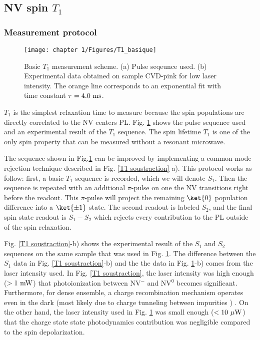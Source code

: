 \documentclass[a4paper,11pt]{report}
\begin{document}
\begin{refsection}
\subsection{NV spin $T_1$}
\label{sec T1 NV}
\subsubsection{Measurement protocol}
\begin{figure}[h!]
\centering
\texttt{[image: chapter 1/Figures/T1\_basique]}
\caption{Basic $T_1$ measurement scheme. (a) Pulse seqeunce used. (b) Experimental data obtained on sample CVD-pink for low laser intensity. The orange line corresponds to an exponential fit with time constant $\tau=4.0\ \rm ms$.}
\label{T1 basique}
\end{figure}


$T_1$ is the simplest relaxation time to measure because the spin populations are directly correlated to the NV centers PL. Fig. \ref{T1 basique} shows the pulse sequence used and an experimental result of the $T_1$ sequence. The spin lifetime $T_1$ is one of the only spin property that can be measured without a resonant microwave.

The sequence shown in Fig.\ref{T1 basique} can be improved by implementing a common mode rejection technique described in Fig. \ref{T1 soustraction}-a). This protocol works as follow: first, a basic $T_1$ sequence is recorded, which we will denote $S_1$. Then the sequence is repeated with an additional $\pi$-pulse on one the NV transitions right before the readout. This $\pi$-pulse will project the remaining $\ket{0}$ population difference into a $\ket{\pm 1}$ state. The second readout is labeled $S_2$, and the final spin state readout is $S_1 -S_2$ which rejects every contribution to the PL outside of the spin relaxation. 



Fig. \ref{T1 soustraction}-b) shows the experimental result of the $S_1$ and $S_2$ sequences on the same sample that was used in Fig. \ref{T1 basique}. The difference between the $S_1$ data in Fig. \ref{T1 soustraction}-b) and the the data in Fig. \ref{T1 basique}-b) comes from the laser intensity used. In Fig. \ref{T1 soustraction}, the laser intensity was high enough ($> 1\ \rm{mW}$) that photoionization between NV$^-$ and NV$^0$ becomes significant. Furthermore, for dense ensemble, a charge recombination mechanism operates even in the dark \citep{giri2018coupled, giri2019selective} (most likely due to charge tunneling between impurities \citep{choi2017depolarization}) . On the other hand, the laser intensity used in Fig. \ref{T1 basique} was small enough ($< 10\ \mu \rm{W}$) that the charge state state photodynamics contribution was negligible compared to the spin depolarization.


\end{refsection}
\end{document}
